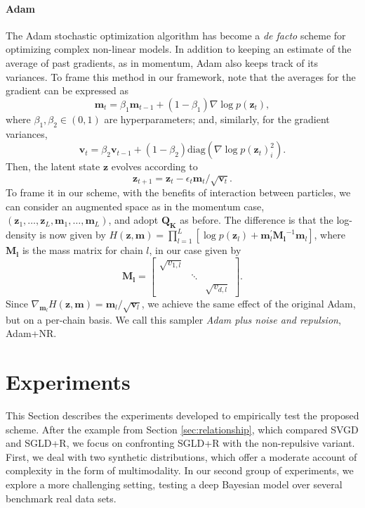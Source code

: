 \paragraph{Adam} The Adam stochastic optimization algorithm has become a \emph{de facto} scheme for optimizing complex non-linear models. In addition to keeping an estimate of the average of past gradients, as in momentum, Adam also keeps track of its variances.
To frame this method in our framework, note that the averages for the gradient can be expressed as
$$
\bm{m}_t = \beta_1 \bm{m}_{t-1} + (1 - \beta_1) \nabla \log p (\bm{z}_t),
$$
where $\beta_1, \beta_2 \in (0, 1)$ are hyperparameters; and, similarly, for the gradient variances,
$$
\bm{v}_t = \beta_2 \bm{v}_{t-1} + (1 - \beta_2) \mbox{diag}(\nabla \log p (\bm{z}_t)_i^2).
$$
Then, the latent state $\bm{z}$ evolves according to
$$
\bm{z}_{t+1} = \bm{z}_t - \epsilon_t \bm{m}_t / \sqrt{\bm{v}_t}.
$$
To frame it in our scheme, with the benefits of interaction between particles, we can consider an augmented space as in the momentum case, $(\bm{z}_1, \ldots, \bm{z}_L, \bm{m}_1, \ldots, \bm{m}_L)$, and adopt $\mathbf{Q_K}$ as before. The difference is that the log-density is now given by $H(\bm{z}, \bm{m}) = \prod_{l=1} ^L \left[ \log p(\bm{z}_l) + \bm{m}_l^{'} \bm{M_l}^{-1} \bm{m}_l \right]$, where $\bm{M_l}$ is the mass matrix for chain $l$, in our case given by
$$
\bm{M_l} = 
\begin{bmatrix}
\sqrt{v_{1,l}} & & \\
 & \ddots & \\
  & & \sqrt{v_{d,l}} 
\end{bmatrix}.
$$
Since $\nabla_{\bm{m}_l} H(\bm{z},\bm{m}) = \bm{m}_l / \sqrt{\bm{v}_l}$, we achieve the same effect of the original Adam, but on a per-chain basis. We call this sampler \emph{Adam plus noise and repulsion}, Adam+NR.





\section{Experiments}\label{sec:experiments}

This Section describes the experiments developed to empirically test the proposed scheme. After the example from Section \ref{sec:relationship}, which compared SVGD and SGLD+R, we focus on confronting SGLD+R with the non-repulsive variant. First, we deal with two synthetic distributions, which offer a moderate account of complexity in the form of multimodality. In our second group of experiments, we explore a more challenging setting, testing a deep Bayesian model over several benchmark real data sets. 

